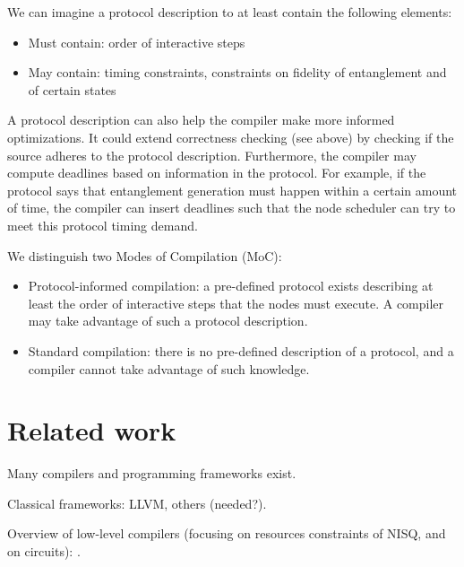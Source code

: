 
We can imagine a protocol description to at least contain the following elements:
\begin{itemize}
    \item Must contain: order of interactive steps
    \item May contain: timing constraints, constraints on fidelity of entanglement and of certain states
\end{itemize}

A protocol description can also help the compiler make more informed optimizations.
It could extend correctness checking (see above) by checking if the source adheres to the protocol description. 
Furthermore, the compiler may compute deadlines based on information in the protocol.
For example, if the protocol says that entanglement generation must happen within a certain amount of time, the compiler can insert deadlines such that the node scheduler can try to meet this protocol timing demand.


We distinguish two Modes of Compilation (MoC):
\begin{itemize}
    \item Protocol-informed compilation: a pre-defined protocol exists describing at least the order of interactive steps that the nodes must execute. A compiler may take advantage of such a protocol description.
    \item Standard compilation: there is no pre-defined description of a protocol, and a compiler cannot take advantage of such knowledge.
\end{itemize}




\section{Related work}
Many compilers and programming frameworks exist.

Classical frameworks: LLVM, others (needed?).

Overview of low-level compilers (focusing on resources constraints of NISQ, and on circuits): \cite{chong_programming_2017, murali_full-stack_2019, bandic_full-stack_2022}.

